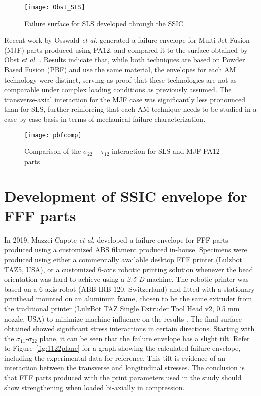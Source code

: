 \documentclass[main.tex]{subfiles}
\begin{document}
\begin{figure}[h]
	\center
	\texttt{[image: Obst\_SLS]}
	\caption{Failure surface for SLS developed through the SSIC \cite{Obst2018}} \label{fig:OOCSLS}
\end{figure}

Recent work by Osswald \emph{et al.} \cite{Osswald2020a} generated a failure envelope for Multi-Jet Fusion (MJF) parts produced using PA12, and compared it to the surface obtained by Obst \emph{et al.} \cite{Obst2018}. Results indicate that, while both techniques are based on Powder Based Fusion (PBF) and use the same material, the envelopes for each AM technology were distinct, serving as proof that these technologies are not as comparable under complex loading conditions as previously assumed. The transverse-axial interaction for the MJF case was significantly less pronounced than for SLS, further reinforcing that each AM technique needs to be studied in a case-by-case basis in terms of mechanical failure characterization. 

\begin{figure}[!htbp]
	\center
	\texttt{[image: pbfcomp]}
	\caption{Comparison of the $\sigma_{22} - \tau_{12}$ interaction for SLS and MJF PA12 parts \cite{Osswald2020a}} \label{fig:pbfcomp}
\end{figure}

\section{Development of SSIC envelope for FFF parts}\label{sec:SSICFFF}

In 2019, Mazzei Capote \emph{et al.} \cite{MazzeiCapote2019} developed a failure envelope for FFF parts produced using a customized ABS filament produced in-house. Specimens were produced using either a commercially available desktop FFF printer (Lulzbot TAZ5, USA), or a customized 6-axis robotic printing solution whenever the bead orientation was hard to achieve using a \emph{2.5-D} machine. The robotic printer was based on a 6-axis robot (ABB IRB-120, Switzerland) and fitted with a stationary printhead mounted on an aluminum frame, chosen to be the same extruder from the traditional printer (LulzBot TAZ Single Extruder Tool Head v2, 0.5 mm nozzle, USA) to minimize machine influence on the results \cite{VanHulle2017}. The final surface obtained showed significant stress interactions in certain directions. Starting with the $\sigma_{11}$-$\sigma_{22}$ plane, it can be seen that the failure envelope has a slight tilt. Refer to Figure~\ref{fig:1122plane} for a graph showing the calculated failure envelope, including the experimental data for reference. This tilt is evidence of an interaction between the transverse and longitudinal stresses. The conclusion is that FFF parts produced with the print parameters used in the study should show strengthening when loaded bi-axially in compression.
\end{document}
